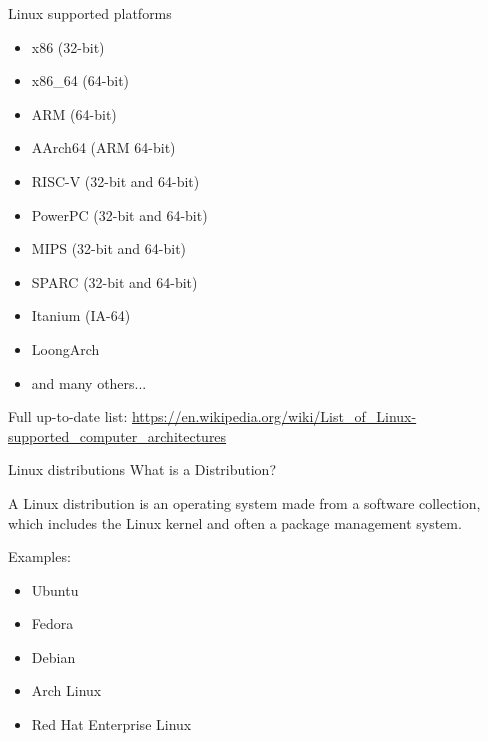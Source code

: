\documentclass{beamer}
\begin{document}
\begin{frame}{Linux supported platforms}
  \begin{itemize}
    \item x86 (32-bit)
    \item x86\_64 (64-bit)
    \item ARM (64-bit)
    \item AArch64 (ARM 64-bit)
    \item RISC-V (32-bit and 64-bit)
    \item PowerPC (32-bit and 64-bit)
    \item MIPS (32-bit and 64-bit)
    \item SPARC (32-bit and 64-bit)
    \item Itanium (IA-64)
    \item LoongArch
    \item and many others...
  \end{itemize}

  \footnotesize Full up-to-date list: \href{https://en.wikipedia.org/wiki/List_of_Linux-supported_computer_architectures}{https://en.wikipedia.org/wiki/List\_of\_Linux-supported\_computer\_architectures}
\end{frame}

\begin{frame}{Linux distributions}
  What is a Distribution?

  A Linux distribution is an operating system made from a software collection, which includes the Linux kernel and often a package management system.

  Examples:
  \begin{itemize}
    \item Ubuntu
    \item Fedora
    \item Debian
    \item Arch Linux
    \item Red Hat Enterprise Linux
  \end{itemize}
\end{frame}
\end{document}
